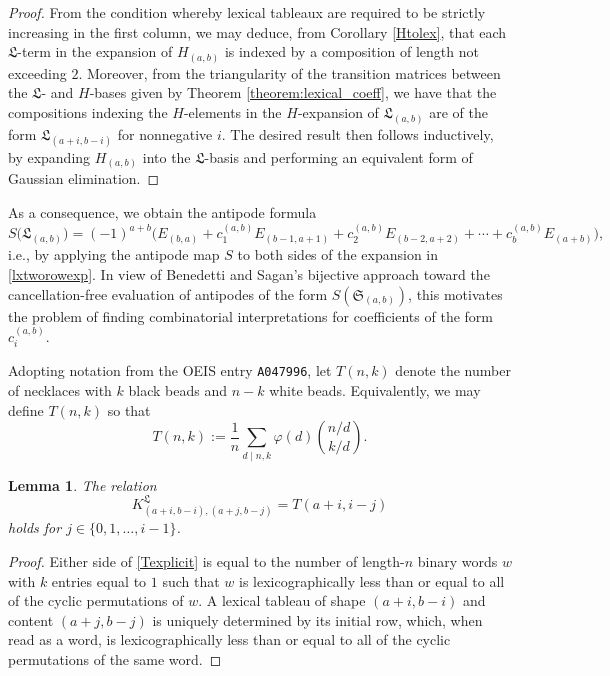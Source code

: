 \documentclass{amsart}
\newtheorem{lemma}[theorem]{Lemma}
\theoremstyle{definition}
\newcommand{\lx}{\mathfrak{L}}
\begin{document}
\begin{proof}
 From the condition whereby lexical tableaux are required to be strictly increasing in the first column, we may deduce, from Corollary 
 \ref{Htolex}, that each $\lx$-term in the expansion of $H_{(a, b)}$ is indexed by a composition of length not exceeding $2$. Moreover, 
 from the triangularity of the transition matrices between the $\lx$- and $H$-bases given by Theorem \ref{theorem:lexical_coeff}, we have 
 that   the compositions indexing the $H$-elements in the $H$-expansion of $\lx_{(a, b)}$ are of the form $\lx_{(a+i,b-i)}$ for nonnegative 
 $i$.   The desired result then follows inductively, by expanding $H_{(a, b)}$ into the $\lx$-basis and performing an equivalent form of 
 Gaussian elimination. 
\end{proof}

 As a consequence, we obtain the antipode formula 
 \begin{equation}\label{antipodeE}
 S\big(\lx_{(a, b)}\big) = (-1)^{a+b} \big( E_{(b, a)} 
 + c_{1}^{(a, b)} E_{(b-1, a + 1)} 
 + c_{2}^{(a, b)} E_{(b-2, a + 2)}
 + \cdots + c_{b}^{(a, b)}
 E_{(a+b)} \big), 
 \end{equation} 
 i.e., by applying the antipode map $S$ to both sides of the expansion in \eqref{lxtworowexp}. In view of Benedetti and Sagan's bijective 
 approach toward the cancellation-free evaluation of antipodes of the form $S(\mathfrak{S}_{(a, b)})$, this motivates the problem of 
 finding combinatorial interpretations for coefficients of the form $c_{i}^{(a, b)}$. 

 Adopting notation from the OEIS entry {\tt A047996}, let $T(n, k)$ denote the number of necklaces with $k$ black beads and $n-k$ white 
 beads. Equivalently, 
 we may define $T(n, k)$ so that 
\begin{equation}\label{Texplicit} 
 T(n, k) := \frac{1}{n}
 \sum_{d \mid n, k} \varphi(d) \binom{n/d}{k/d}. 
\end{equation} 

\begin{lemma}\label{relationT}
 The relation $$ K^{\lx}_{(a+i,b-i), (a+j,b-j)} = T(a+i,i-j) $$ holds for $j \in \{ 0, 1, \ldots, i-1 \}$. 
\end{lemma}

\begin{proof}
 Either side of \eqref{Texplicit} is equal to the number of length-$n$ binary words $w$ with $k$ entries equal to $1$ such that $w$ is 
 lexicographically less than or equal to all of the cyclic permutations of $w$. A lexical tableau of shape $(a+i,b-i)$ and content $(a+j,b-j)$ 
 is uniquely determined by its initial row, which, when read as a word, is lexicographically less than or equal to all of the cyclic 
 permutations of the same word. 
\end{proof} 
\end{document}
